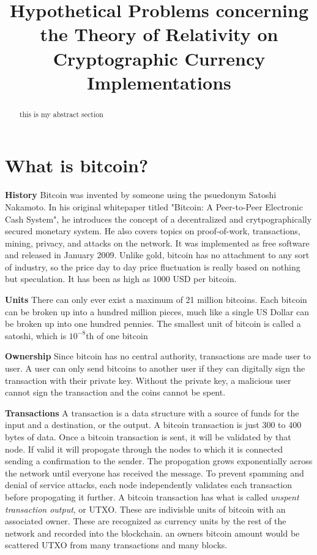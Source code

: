 \documentclass[conference]{IEEEtran}
\begin{document}
\title{Hypothetical Problems concerning the Theory of Relativity on Cryptographic Currency Implementations}
\author
{
}
\maketitle

\begin{abstract}
this is my abstract section
\end{abstract}

\section{What is bitcoin?}
\textbf{History} Bitcoin was invented by someone using the psuedonym Satoshi Nakamoto. In his original whitepaper titled "Bitcoin: A Peer-to-Peer Electronic Cash System", he introduces the concept of a decentralized and crytpographically secured monetary system. He also covers topics on proof-of-work, transactions, mining, privacy, and attacks on the network.\cite{nakamoto} It was implemented as free software and released in January 2009. Unlike gold, bitcoin has no attachment to any sort of industry, so the price day to day price fluctuation is really based on nothing but speculation. It has been as high as 1000 USD per bitcoin.\cite{1000usd}

\textbf{Units} There can only ever exist a maximum of 21 million bitcoins. Each bitcoin can be broken up into a hundred million pieces, much like a single US Dollar can be broken up into one hundred pennies. The smallest unit of bitcoin is called a satoshi, which is $10^{-8}$th of one bitcoin 

\textbf{Ownership} Since bitcoin has no central authority, transactions are made user to user. A user can only send bitcoins to another user if they can digitally sign the transaction with their private key. Without the private key, a malicious user cannot sign the transaction and the coins cannot be spent. 

\textbf{Transactions} A transaction is a data structure with a source of funds for the input and a destination, or the output. A bitcoin transaction is just 300 to 400 bytes of data. Once a bitcoin transaction is sent, it will be validated by that node. If valid it will propogate through the nodes to which it is connected sending a confirmation to the sender. The propogation grows exponentially across the network until everyone has received the message. To prevent spamming and denial of service attacks, each node independently validates each transaction before propogating it further. A bitcoin transaction has what is called \textit{unspent transaction output}, or UTXO. These are indivisble units of bitcoin with an associated owner. These are recognized as currency units by the rest of the network and recorded into the blockchain. an owners bitcoin amount would be scattered UTXO from many transactions and many blocks. 
\end{document}
